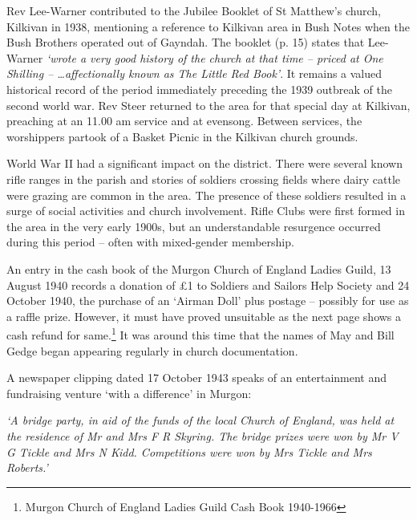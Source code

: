 Rev Lee-Warner contributed to the Jubilee Booklet of St Matthew's church, Kilkivan in 1938, mentioning a reference to Kilkivan area in Bush Notes when the Bush Brothers operated out of Gayndah. The booklet (p. 15) states that Lee-Warner \emph{`wrote a very good history of the church at that time -- priced at One Shilling -- \ldots affectionally known as The Little Red Book'}. It remains a valued historical record of the period immediately preceding the 1939 outbreak of the second world war. Rev Steer returned to the area for that special day at Kilkivan, preaching at an 11.00 am service and at evensong. Between services, the worshippers partook of a Basket Picnic in the Kilkivan church grounds.



World War II had a significant impact on the district. There were several known rifle ranges in the parish and stories of soldiers crossing fields where dairy cattle were grazing are common in the area. The presence of these soldiers resulted in a surge of social activities and church involvement. Rifle Clubs were first formed in the area in the very early 1900s, but an understandable resurgence occurred during this period -- often with mixed-gender membership.



An entry in the cash book of the Murgon Church of England Ladies Guild, 13 August 1940 records a donation of \pounds1 to Soldiers and Sailors Help Society and 24 October 1940, the purchase of an `Airman Doll' plus postage -- possibly for use as a raffle prize. However, it must have proved unsuitable as the next page shows a cash refund for same.\footnote{Murgon Church of England Ladies Guild Cash Book 1940-1966} It was around this time that the names of May and Bill Gedge began appearing regularly in church documentation.


A newspaper clipping dated 17 October 1943 speaks of an entertainment and fundraising venture `with a difference' in Murgon:



\emph{`A bridge party, in aid of the funds of the local Church of England, was held at the residence of Mr and Mrs F R Skyring. The bridge prizes were won by Mr V G Tickle and Mrs N Kidd. Competitions were won by Mrs Tickle and Mrs Roberts.'}



\smallskip


